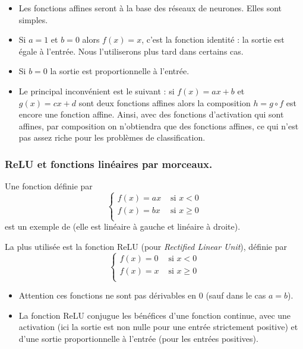 \documentclass[11pt,class=report,crop=false]{standalone}
\begin{document}
\begin{remarque*}
  \sauteligne
\begin{itemize}
  \item Les fonctions affines seront à la base des réseaux de neurones. Elles sont simples.
  \item Si $a=1$ et $b=0$ alors $f(x)=x$, c'est la fonction identité : la sortie est égale à l'entrée. Nous l'utiliserons plus tard dans certains cas.
  \item Si $b=0$ la sortie est proportionnelle à l'entrée.
  \item Le principal inconvénient est le suivant : si $f(x) = ax+b$ et $g(x)=cx+d$ sont deux fonctions affines alors la composition $h = g\circ f$ est encore une fonction affine. Ainsi, avec des fonctions d'activation qui sont affines, par composition on n'obtiendra que des fonctions affines, ce qui n'est pas assez riche pour les problèmes de classification.
  
  
\end{itemize}
\end{remarque*}



\bigskip
\subsubsection{ReLU et fonctions linéaires par morceaux.}

Une fonction définie par 
$$\begin{cases}
f(x) = ax & \text{ si } x < 0 \\
f(x) = bx  & \text{ si } x \ge 0 \\
\end{cases}$$
est un exemple de  (elle est linéaire à gauche et linéaire à droite). 


La plus utilisée est la fonction ReLU (pour \emph{Rectified Linear Unit}),
définie par 
$$\begin{cases}
f(x) = 0 & \text{ si } x < 0 \\
f(x) = x  & \text{ si } x \ge 0 \\
\end{cases}$$



\begin{remarque*}
  \sauteligne
\begin{itemize}
  \item Attention ces fonctions ne sont pas dérivables en $0$ (sauf dans le cas $a=b$).
  \item La fonction ReLU conjugue les bénéfices d'une fonction continue, avec une activation (ici la sortie est non nulle pour une entrée strictement  positive) et d'une sortie proportionnelle à l'entrée (pour les entrées positives).
\end{itemize}
\end{remarque*}
\end{document}
